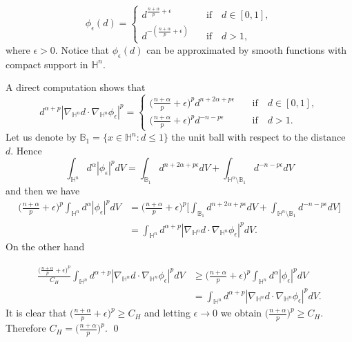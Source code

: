 \documentclass[12pt]{amsart}
\numberwithin{equation}{section}
\numberwithin{theorem}{section}
\numberwithin{theorem}{section} \numberwithin{lemma}{section}
\numberwithin{definition}{section}
\numberwithin{corollary}{section}
\numberwithin{remark}{section}
\numberwithin{proposition}{section}
\begin{document}
\begin{equation} \phi_{\epsilon}(d)=
\begin{cases}
 d^{\frac{n+\alpha}{p}+\epsilon} &\quad\text{if}  \quad d\in [0, 1], \\
d^{-(\frac{n+\alpha}{p}+\epsilon)} &\quad \text{if} \quad d>1,
\end{cases}
\end{equation} where $\epsilon>0$.  Notice that $\phi_{\epsilon}(d)$
can be approximated by smooth functions with compact support in
$\mathbb{H}^n$.

 A direct computation shows that
\[d^{\alpha+p}|\nabla_{\mathbb{H}^n}d\cdot\nabla_{\mathbb{H}^n}\phi_{\epsilon}|^p =
\begin{cases}\big(\frac{n+\alpha}{p}+\epsilon\big)^p d^{n+2\alpha+p\epsilon} &\quad\text{if}  \quad d\in [0, 1], \\
\big(\frac{n+\alpha}{p}+\epsilon\big)^pd^{-n-p\epsilon}
&\quad\text{if} \quad d>1. \end{cases} \]  Let us denote by
$\mathbb{B}_1=\{x\in \mathbb{H}^n: d\le 1\}$ the unit ball with
respect to the distance $d$.  Hence
\[\int_{\mathbb{H}^n} d^{\alpha}
|\phi_{\epsilon}|^pdV=\int_{\mathbb{B}_1}
d^{n+2\alpha+p\epsilon}dV+\int_{\mathbb{H}^n\setminus \mathbb{B}_1}
d^{-n-p\epsilon}dV\]  and then we have
\[\begin{aligned}\big(\frac{n+\alpha}{p}+\epsilon\big)^p\int_{\mathbb{H}^n}d^{\alpha}
|\phi_{\epsilon}|^pdV
&=\big(\frac{n+\alpha}{p}+\epsilon\big)^p\Big[\int_{\mathbb{B}_1}d^{n+2\alpha+p\epsilon}dV+
\int_{\mathbb{H}^n\setminus
\mathbb{B}_1}d^{-n-p\epsilon}dV\Big]\\
&=\int_{\mathbb{H}^n}d^{\alpha+p}|\nabla_{\mathbb{H}^n}d\cdot\nabla_{\mathbb{H}^n}\phi_{\epsilon}|^pdV.\end{aligned}\]
On the other hand

\[\begin{aligned}
\frac{\big(\frac{n+\alpha}{p}+\epsilon\big)^p}{C_H}
\int_{\mathbb{H}^n}d^{\alpha+p}|\nabla_{\mathbb{H}^n}d\cdot\nabla_{\mathbb{H}^n}\phi_{\epsilon}|^pdV
&\ge
\big(\frac{n+\alpha}{p}+\epsilon\big)^p\int_{\mathbb{H}^n}d^{\alpha}
|\phi_{\epsilon}|^pdV
\\ &=\int_{\mathbb{H}^n}d^{\alpha+p}|\nabla_{\mathbb{H}^n}d\cdot\nabla_{\mathbb{H}^n}\phi_{\epsilon}|^pdV.\end{aligned}\]
It is clear that  $\big(\frac{n+\alpha}{p}+\epsilon \big)^p\ge C_H$
and letting $\epsilon \longrightarrow 0$ we obtain
$\big(\frac{n+\alpha}{p} \big)^p\ge C_H$. Therefore
$C_H=\big(\frac{n+\alpha}{p} \big)^p$. \qed
\medskip
\end{document}
